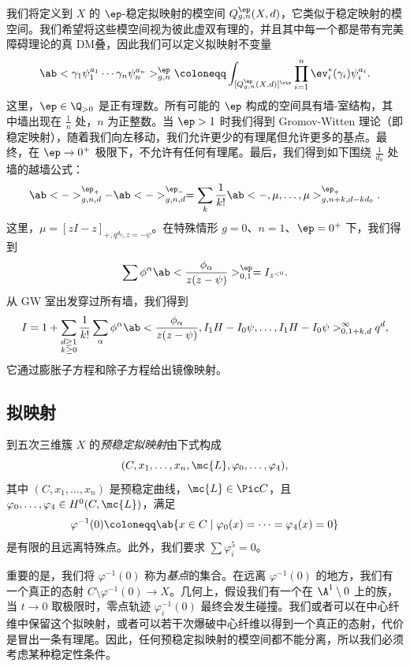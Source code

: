 我们将定义到 \(X\) 的 \(\ep\)-稳定拟映射的模空间 \(Q_{g,n}^{\ep}(X, d)\)，它类似于稳定映射的模空间。我们希望将这些模空间视为彼此虚双有理的，并且其中每一个都是带有完美障碍理论的真 DM叠，因此我们可以定义拟映射不变量
\[ \ab< \gamma_1 \psi_1^{a_1} \cdots \gamma_n \psi_n^{a_n}>_{g,n}^{\ep} \coloneqq \int_{[Q_{g,n}^{\ep}(X,d)]^{\vir}} \prod_{i=1}^n \ev_i^*(\gamma_i) \psi_i^{a_i}. \]
这里，\(\ep \in \Q_{>0}\) 是正有理数。所有可能的 \(\ep\) 构成的空间具有墙-室结构，其中墙出现在 \(\frac{1}{n}\) 处，\(n\) 为正整数。当 \(\ep > 1\) 时我们得到 Gromov-Witten 理论（即稳定映射），随着我们向左移动，我们允许更少的有理尾但允许更多的基点。最终，在 \(\ep \to 0^+\) 极限下，不允许有任何有理尾。最后，我们得到如下围绕 \(\frac{1}{d_0}\) 处墙的越墙公式：
\[ \ab<->_{g,n,d}^{\ep_+} - \ab<->_{g,n,d}^{\ep_-} = \sum_{k} \frac{1}{k!} \ab<-, \mu, \ldots, \mu>_{g,n+k, d-kd_0}^{\ep_+}. \]
这里，\(\mu = [zI-z]_{+, q^{d_0}, z=-\psi}\)。在特殊情形 \(g = 0\)、\(n = 1\)、\(\ep = 0^+\) 下，我们得到
\[ \sum \phi^{\alpha} \ab<\frac{\phi_{\alpha}}{z(z-\psi)}>^{\ep}_{0,1} = I_{z^{<0}}. \]
从 GW 室出发穿过所有墙，我们得到
\[ I = 1 + \sum_{\substack{d \geq 1 \\ k \geq 0}} \frac{1}{k!} \sum_{\alpha} \phi^{\alpha} \ab< \frac{\phi_{\alpha}}{z(z-\psi)}, I_1 H - I_0 \psi, \ldots, I_1 H - I_0 \psi>_{0,1+k,d}^{\infty} q^d, \]
它通过膨胀子方程和除子方程给出镜像映射。

\subsection{拟映射}%
\label{sub:Quasimaps}

\begin{defn}
    到五次三维簇 \(X\) 的\textit{预稳定拟映射}由下式构成
    \[(C, x_1, \ldots, x_n, \mc{L}, \varphi_0, \ldots, \varphi_4),\] 
    其中 \((C, x_1, \ldots, x_n)\) 是预稳定曲线，\(\mc{L} \in \Pic C\)，且 \(\varphi_0, \ldots, \varphi_4 \in H^0(C, \mc{L})\)，满足
    \[ \varphi^{-1}(0) \coloneqq \ab\{x \in C \mid \varphi_0(x) = \cdots = \varphi_4(x) = 0 \} \]
    是有限的且远离特殊点。此外，我们要求 \(\sum \varphi_i^5 = 0\)。
\end{defn}

重要的是，我们将 \(\varphi^{-1}(0)\) 称为\textit{基点}的集合。在远离 \(\varphi^{-1}(0)\) 的地方，我们有一个真正的态射 \(C \setminus \varphi^{-1}(0) \to X\)。几何上，假设我们有一个在 \(\A^1 \setminus 0\) 上的族，当 \(t \to 0\) 取极限时，零点轨迹 \(\varphi_i^{-1}(0)\) 最终会发生碰撞。我们或者可以在中心纤维中保留这个拟映射，或者可以若干次爆破中心纤维以得到一个真正的态射，代价是冒出一条有理尾。因此，任何预稳定拟映射的模空间都不能分离，所以我们必须考虑某种稳定性条件。

